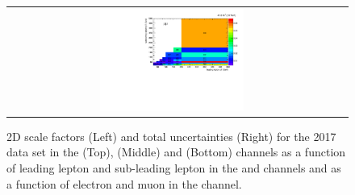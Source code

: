 \begin{figure}[htb]
\begin{center}
\begin{tabular}{cc}
      \includegraphics[width=0.45\textwidth]{fig_2017_TrigSF/h2D_lepABpt_mumu_BinErrors.pdf}\\
    \end{tabular}
    \caption{2D scale factors (Left) and total uncertainties (Right) for the 2017 data set in the \emu (Top), \ee (Middle) and \mumu (Bottom) channels as a function of leading lepton \pT and sub-leading lepton \pT in the \ee and \mumu channels and as a function of electron \pT and muon \pT in the \emu channel.}
    \label{TrigSF_2017_4}
  \end{center}
\end{figure}

